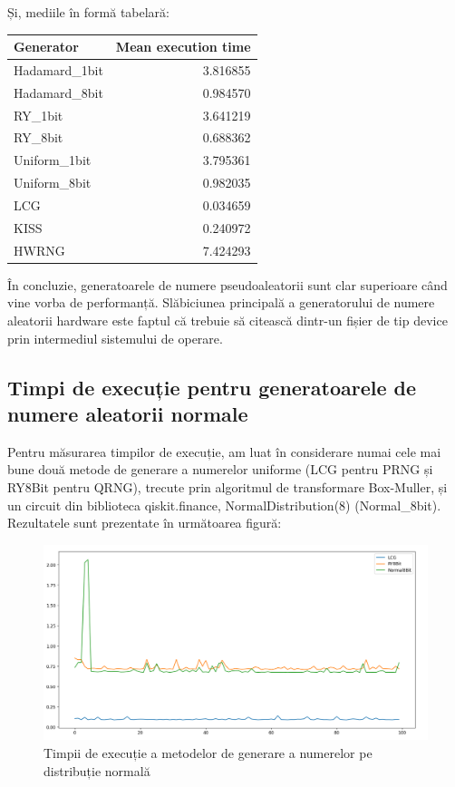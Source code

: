 Și, mediile în formă tabelară:

\begin{tabular}{|l|r|}
\hline
{Generator} & {Mean execution time} \\
\hline
Hadamard\_1bit &  3.816855 \\
Hadamard\_8bit &  0.984570 \\
RY\_1bit       &  3.641219 \\
RY\_8bit       &  0.688362 \\
Uniform\_1bit  &  3.795361 \\
Uniform\_8bit  &  0.982035 \\
LCG           &  0.034659 \\
KISS          &  0.240972 \\
HWRNG         &  7.424293 \\
\hline
\end{tabular}

În concluzie, generatoarele de numere pseudoaleatorii sunt clar superioare când vine vorba de performanță. Slăbiciunea principală a generatorului de numere aleatorii hardware este faptul că trebuie să citească dintr-un fișier de tip device prin intermediul sistemului de operare.

\subsection{Timpi de execuție pentru generatoarele de numere aleatorii normale}

Pentru măsurarea timpilor de execuție, am luat în considerare numai cele mai bune două metode de generare a numerelor uniforme (LCG pentru PRNG și RY8Bit pentru QRNG), trecute prin algoritmul de transformare Box-Muller, și un circuit din biblioteca qiskit.finance, NormalDistribution(8) (Normal\_8bit). Rezultatele sunt prezentate în următoarea figură:

\begin{figure}[H]
    \centering
    \includegraphics[width=1.0\textwidth]{continut/capitol4/figuri/NormalTimes.png}
    \caption{Timpii de execuție a metodelor de generare a numerelor pe distribuție normală}
    \label{fig:NormalTimes}
\end{figure}

